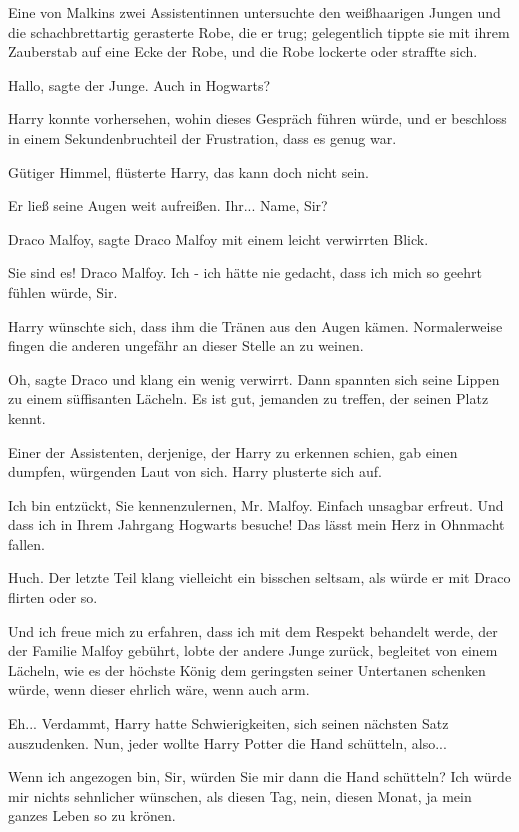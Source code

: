 Eine von Malkins zwei Assistentinnen untersuchte den weißhaarigen Jungen und die
schachbrettartig gerasterte Robe, die er trug; gelegentlich tippte sie mit ihrem
Zauberstab auf eine Ecke der Robe, und die Robe lockerte oder straffte sich.

\glqq{}Hallo\grqq{}, sagte der Junge. \glqq{}Auch in Hogwarts?\grqq{}

Harry konnte vorhersehen, wohin dieses Gespräch führen würde, und er beschloss
in einem Sekundenbruchteil der Frustration, dass es genug war.

\glqq{}Gütiger Himmel\grqq{}, flüsterte Harry, \glqq{}das kann doch nicht
sein.\grqq{}

Er ließ seine Augen weit aufreißen. \glqq{}Ihr... Name, Sir?\grqq{}

\glqq{}Draco Malfoy\grqq{}, sagte Draco Malfoy mit einem leicht verwirrten Blick.

\glqq{}Sie sind es! Draco Malfoy. Ich - ich hätte nie gedacht, dass ich mich so
geehrt fühlen würde, Sir.\grqq{}

Harry wünschte sich, dass ihm die Tränen aus den Augen kämen. Normalerweise
fingen die anderen ungefähr an dieser Stelle an zu weinen.

\glqq{}Oh\grqq{}, sagte Draco und klang ein wenig verwirrt. Dann spannten sich
seine Lippen zu einem süffisanten Lächeln. \glqq{}Es ist gut, jemanden zu
treffen, der seinen Platz kennt.\grqq{}

Einer der Assistenten, derjenige, der Harry zu erkennen schien, gab einen
dumpfen, würgenden Laut von sich. Harry plusterte sich auf.

\glqq{}Ich bin entzückt, Sie kennenzulernen, Mr. Malfoy. Einfach unsagbar
erfreut. Und dass ich in Ihrem Jahrgang Hogwarts besuche! Das lässt mein Herz in
Ohnmacht fallen.\grqq{}

Huch. Der letzte Teil klang vielleicht ein bisschen seltsam, als würde er mit
Draco flirten oder so.

\glqq{}Und ich freue mich zu erfahren, dass ich mit dem Respekt behandelt werde,
der der Familie Malfoy gebührt\grqq{}, lobte der andere Junge zurück, begleitet
von einem Lächeln, wie es der höchste König dem geringsten seiner Untertanen
schenken würde, wenn dieser ehrlich wäre, wenn auch arm.

Eh... Verdammt, Harry hatte Schwierigkeiten, sich seinen nächsten Satz
auszudenken. Nun, jeder wollte Harry Potter die Hand schütteln, also...

\glqq{}Wenn ich angezogen bin, Sir, würden Sie mir dann die Hand schütteln? Ich
würde mir nichts sehnlicher wünschen, als diesen Tag, nein, diesen Monat, ja
mein ganzes Leben so zu krönen.\grqq{}

